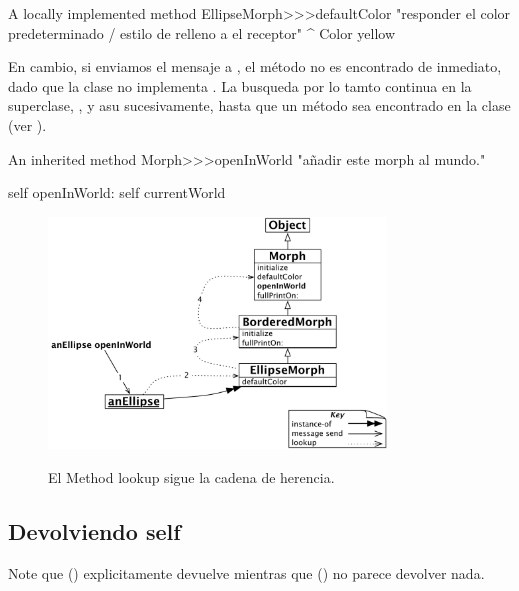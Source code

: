 \documentclass[a4paper,10pt,twoside]{book}
\begin{document}
\begin{method}[defaultColor]{A locally implemented method}
EllipseMorph>>>defaultColor
	"responder el color predeterminado / estilo de relleno a el receptor"
	^ Color yellow
\end{method}

En cambio, si enviamos el mensaje  a , el m\'etodo no es encontrado de inmediato, dado que la clase  no implementa .
La busqueda por lo tamto continua en la superclase, , y asu sucesivamente, hasta que un m\'etodo  sea encontrado en la clase  (ver ).

\begin{method}[openInWorld]{An inherited method}
Morph>>>openInWorld
	"a\~nadir este morph al mundo."

	self openInWorld: self currentWorld
\end{method}

\begin{figure}[htb]
\begin{center}
	{\includegraphics[width=0.8\textwidth]{openInWorldLookup}}
\caption{El Method lookup sigue la cadena de herencia.}
\end{center}
\end{figure}

\subsection{Devolviendo self}

Note que  () explicitamente devuelve  mientras que  () no parece devolver nada.
\end{document}
